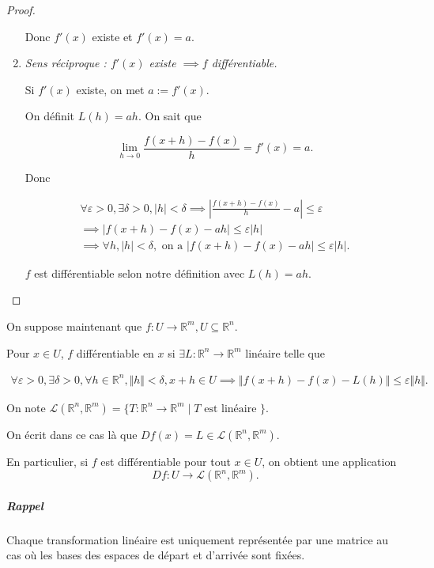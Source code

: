 \documentclass[french]{article}
\theoremstyle{definition}
\theoremstyle{remark}
\newcommand{\lesss}{<}
\newcommand{\less}{\lesss}
\newcommand{\biggg}{>}
\newcommand{\bg}{\biggg}
\begin{document}
\begin{proof}
\begin{enumerate}
    Donc $f'(x)$ existe et $f'(x) = a$.

    \item \emph{Sens réciproque : $f'(x)$ existe $\implies f$ différentiable.}

    Si $f'(x)$ existe, on met $a :=f'(x)$.

    On définit $L(h) =ah$. On sait que

    $$ \lim_{h \to 0} \frac{f(x+h)-f(x)}{h} = f'(x) = a.$$

    Donc

    \begin{gather*}
      \forall \varepsilon \bg 0, \exists \delta  \bg 0, \lvert h \rvert \less \delta \implies \left\lvert \frac{f(x+h)-f(x)}{h} -a \right\rvert \leq \varepsilon  \\
      \implies \lvert f(x+h) -f(x) -ah \rvert \leq \varepsilon \lvert h \rvert \\
      \implies \forall h, \lvert h \rvert \less \delta, \text{ on a } \lvert f(x+h) - f(x) -ah \rvert \leq \varepsilon \lvert h \rvert.
    \end{gather*}

    $f$ est différentiable selon notre définition avec $L(h) =ah$.
  \end{enumerate}
\end{proof}


On suppose maintenant que $f:U \to \mathbb{R}^m, U \subseteq \mathbb{R}^n$.

Pour $x \in U$, $f$ différentiable en $x$ si $\exists L : \mathbb{R}^n \to \mathbb{R}^m$ linéaire telle que

\begin{gather*}
  \forall \varepsilon  \bg 0, \exists \delta  \bg 0, \forall h \in \mathbb{R}^n, \Vert h \Vert \less \delta, x+h \in U \implies \Vert f(x+h) -f(x)-L(h) \Vert \leq \varepsilon \Vert h \Vert.
\end{gather*}

On note $\mathscr{L}(\mathbb{R}^n, \mathbb{R}^m) = \{  T: \mathbb{R}^n \to \mathbb{R}^m \mid T \text{ est linéaire }   \} $.

On écrit dans ce cas là que $Df(x) = L \in \mathscr{L}(\mathbb{R}^n, \mathbb{R}^m)  $.

En particulier, si $f$ est différentiable pour tout $x \in U$, on obtient une application $$Df : U \to \mathscr{L}(\mathbb{R}^n, \mathbb{R}^m). $$

\subparagraph{Rappel} Chaque transformation linéaire est uniquement représentée par une matrice au cas où les bases des espaces de départ et d'arrivée sont fixées.
\end{document}
